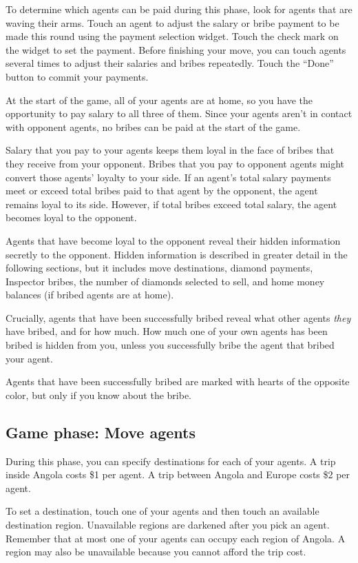 \documentclass[8pt]{extbook}
\begin{document}
To determine which agents can be paid during this phase, look for agents that are waving their arms.  Touch an agent to adjust the salary or bribe payment to be made this round using the payment selection widget.  Touch the check mark on the widget to set the payment.  Before finishing your move, you can touch agents several times to adjust their salaries and bribes repeatedly.  Touch the ``Done'' button to commit your payments. 

At the start of the game, all of your agents are at home, so you have the opportunity to pay salary to all three of them.  Since your agents aren't in contact with opponent agents, no bribes can be paid at the start of the game.

Salary that you pay to your agents keeps them loyal in the face of bribes that they receive from your opponent.  Bribes that you pay to opponent agents might convert those agents' loyalty to your side.  If an agent's total salary payments meet or exceed total bribes paid to that agent by the opponent, the agent remains loyal to its side.  However, if total bribes exceed total salary, the agent becomes loyal to the opponent.

Agents that have become loyal to the opponent reveal their hidden information secretly to the opponent.  Hidden information is described in greater detail in the following sections, but it includes move destinations, diamond payments, Inspector bribes, the number of diamonds selected to sell, and home money balances (if bribed agents are at home).

Crucially, agents that have been successfully bribed reveal what other agents {\it they} have bribed, and for how much.  How much one of your own agents has been bribed is hidden from you, unless you successfully bribe the agent that bribed your agent.

Agents that have been successfully bribed are marked with hearts of the opposite color, but only if you know about the bribe.

\subsection{Game phase:  Move agents}
\label{sec:movePhase}

During this phase, you can specify destinations for each of your agents.  A trip inside Angola costs \$1 per agent.  A trip between Angola and Europe costs \$2 per agent.

To set a destination, touch one of your agents and then touch an available destination region.  Unavailable regions are darkened after you pick an agent.  Remember that at most one of your agents can occupy each region of Angola.  A region may also be unavailable because you cannot afford the trip cost.
\end{document}
